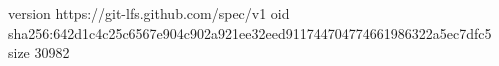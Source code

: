 version https://git-lfs.github.com/spec/v1
oid sha256:642d1c4c25c6567e904c902a921ee32eed911744704774661986322a5ec7dfc5
size 30982
